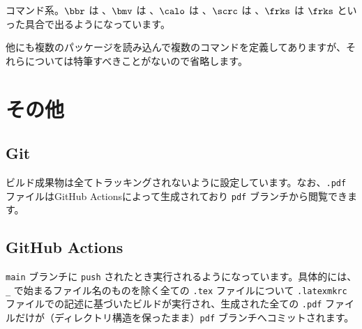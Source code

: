 \documentclass[a4paper]{ltjsarticle}
\begin{document}
コマンド系。$\bbr$ は \texttt{\string\bbr}、$\bmv$ は \texttt{\string\bmv}、$\calo$ は \texttt{\string\calo}、$\scrc$ は \texttt{\string\scrc}、$\frks$ は $\texttt{\string\frks}$ といった具合で出るようになっています。

他にも複数のパッケージを読み込んで複数のコマンドを定義してありますが、それらについては特筆すべきことがないので省略します。

\section{その他}

\subsection{Git}
ビルド成果物は全てトラッキングされないように設定しています。なお、\texttt{.pdf} ファイルはGitHub Actionsによって生成されており \texttt{pdf} ブランチから閲覧できます。

\subsection{GitHub Actions}
\texttt{main} ブランチに \texttt{push} されたとき実行されるようになっています。具体的には、\texttt{\_} で始まるファイル名のものを除く全ての \texttt{.tex} ファイルについて \texttt{.latexmkrc} ファイルでの記述に基づいたビルドが実行され、生成された全ての \texttt{.pdf} ファイルだけが（ディレクトリ構造を保ったまま）\texttt{pdf} ブランチへコミットされます。
\end{document}
